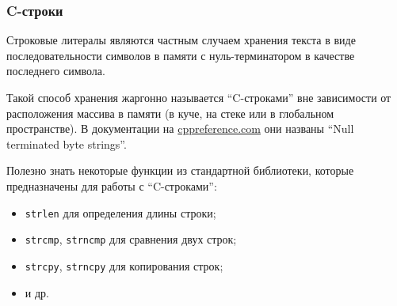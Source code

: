 \documentclass[compress, 8pt]{beamer}
\begin{document}
\begin{frame}[fragile]

    \frametitle{C-строки}

    Строковые литералы являются частным случаем хранения текста
    в виде последовательности символов в памяти с нуль-терминатором
    в качестве последнего символа.

    \hfill \break
    Такой способ хранения жаргонно называется \enquote{C-строками}
    вне зависимости от расположения массива в памяти (в куче, на стеке или
    в глобальном пространстве).
    В документации на \href{https://en.cppreference.com/}{cppreference.com} они названы
    \enquote{Null terminated byte strings}\footnotemark{}.


    \hfill \break
    Полезно знать некоторые функции из стандартной библиотеки, которые
    предназначены для работы с \enquote{C-строками}:

    \begin{itemize}

        \item \texttt{strlen} \textemdash \space для определения длины строки;

        \item \texttt{strcmp}, \texttt{strncmp} \textemdash \space
            для сравнения двух строк;

        \item \texttt{strcpy}, \texttt{strncpy} \textemdash \space
            для копирования строк;

        \item и др.
        
    \end{itemize}
    
\end{frame}
\end{document}
